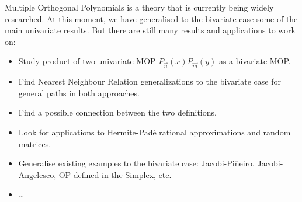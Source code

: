 \documentclass[portrait,final,a0paper,fontscale=0.38]{baposter}
\begin{document}
\begin{poster}
{
  Multiple Orthogonal Polynomials is a theory that is currently being widely researched. At this moment, we have generalised to the bivariate case some of the main univariate results. But there are still many results and applications to work on:
  \begin{itemize}
    \item Study product of two univariate MOP $P_{\vec n}(x)P_{\vec m}(y)$ as a bivariate MOP. 
    \item Find Nearest Neighbour Relation generalizations to the bivariate case for general paths in both approaches.
    \item Find a possible connection between the two definitions.
    \item Look for applications to Hermite-Padé rational approximations and random matrices.
    \item Generalise existing examples to the bivariate case: Jacobi-Piñeiro, Jacobi-Angelesco, OP defined in the Simplex, etc.
    \item \dots
  \end{itemize}


}



































%
%
\end{poster}
\end{document}
